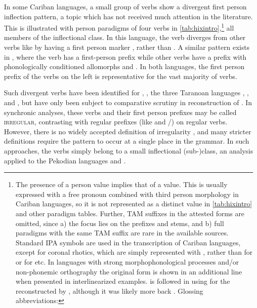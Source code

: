 In some Cariban languages, a small group of verbs show a divergent first person inflection pattern, a topic which has not received much attention in the literature.
This is illustrated with person paradigms of four \hixka verbs in \cref{tab:hixintro},\footnote{The presence of a  person value implies that of a  value.
This is usually expressed with a free pronoun combined with third person morphology in Cariban languages, so it is not represented as a distinct value in \cref{tab:hixintro} and other paradigm tables.
Further, TAM suffixes in the attested forms are omitted, since a) the focus lies on the prefixes and stems, and b) full paradigms with the same TAM suffix are rare in the available sources.
Standard IPA symbols are used in the transcription of Cariban languages, except for coronal rhotics, which are simply represented with , rather than  for \wayana or  for \maqui etc.
In languages with strong morphophonological processes and/or non-phonemic orthography the original form is shown in an additional line when presented in interlinearized examples.
\textcite{gildea2018reconstructing} is followed in using  for the \PC reconstructed by \textcite{meira2005southern}, although it was likely more back \parencite{gildea2010story}.
Glossing abbreviations: } %
all members of the  inflectional class.
In this language, the verb  diverges from other  verbs like  by having a first person marker , rather than .
A similar pattern exists in \trio, where the verb  has a first-person prefix  while other  verbs have a prefix with phonologically conditioned allomorphs  and  .
In both languages, the first person prefix of the verbs on the left is representative for the vast majority of  verbs.

Such divergent verbs have been identified for \hixka \parencite[188]{hixkaryanaderby1985}, \waiwai \parencite[90]{gildea1998}, the three Taranoan languages \parencite[112--115]{meira1998proto}, \bakairi \parencite{meira2003bakairi}, and \arara \parencite[153]{alves2017arara}, but have only been subject to comparative scrutiny in  reconstruction of \PTar.
In synchronic analyses, these verbs and their first person prefixes may be called \textsc{irregular}, contrasting with regular prefixes (like \hixka {} and \trio {}/) on regular verbs.
However, there is no widely accepted definition of irregularity \parencite{stolz2012introduction}, and many stricter definitions \parencite[e.g.,][]{haspelmath2010understanding} require the pattern to occur at a single place in the grammar.
In such approaches, the verbs simply belong to a small inflectional (sub-)class, an analysis applied to the Pekodian languages \bakairi and \arara \parencites[4]{meira2003bakairi}[149]{alves2017arara}.

